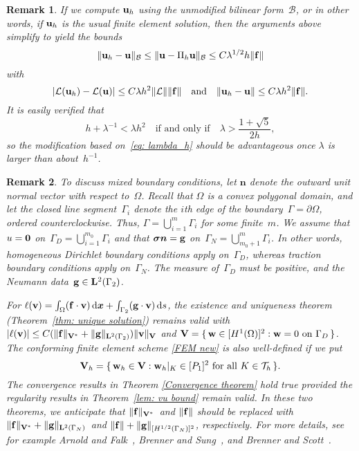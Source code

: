 \documentclass[11pt]{article}
\newcommand{\calB}{\mathcal{B}}
\newcommand{\calL}{\mathcal{L}}
\newcommand{\vf}{{\bf f}}
\newcommand{\vu}{{\bf u}}
\newcommand{\vv}{{\bf v}}
\newcommand{\vV}{{\bf V}}
\newcommand{\vw}{{\bf w}}
\newcommand{\bsx}{{\boldsymbol{x}}}
\newcommand{\vsigma}{\boldsymbol{\sigma}}
\numberwithin{equation}{section}
\newcommand{\ud}{\mathrm{d}}
\newtheorem{remark}{Remark}[section]
\begin{document}
\begin{remark}
If we compute $\vu_h$ using the unmodified bilinear form~$\calB$, or in other
words, if $\vu_h$ is the usual finite element solution, then the arguments above
simplify to yield the bounds
\[
\|\vu_h-\vu\|_{\calB}\le\|\vu-\Pi_h\vu\|_{\calB}
\le C\lambda^{1/2}h\|\vf\|
\]
with
\[
|\calL(\vu_h)-\calL(\vu)|\le C\lambda h^2\|\calL\|\|\vf\|
\quad\text{and}\quad
\|\vu_h-\vu\|\le C\lambda h^2\|\vf\|.
\]
It is easily verified that
\[
h+\lambda^{-1}<\lambda h^2\quad\text{if and only if}\quad
\lambda>\frac{1+\sqrt{5}}{2h},
\]
so the modification based on~\eqref{eq: lambda_h} should be
advantageous once $\lambda$ is larger than about~$h^{-1}$.
\end{remark}
\begin{remark}
To discuss mixed boundary conditions, let $\boldsymbol{n}$ denote the outward 
unit normal vector with respect to~$\Omega$. Recall that $\Omega$ is a convex polygonal domain, and let the 
closed line segment~$\Gamma_i$ denote the $i$th edge of the boundary~$\Gamma=\partial\Omega$, ordered 
counterclockwise.  Thus, $\Gamma=\bigcup_{i=1}^m \Gamma_i$ for some finite~$m$. We assume  that 
$u={\bf 0}$ on~$\Gamma_D=\bigcup_{i=1}^{m_0} \Gamma_i$ and that $\vsigma\boldsymbol{n}={\bf g}$ 
on~$\Gamma_N=\bigcup_{m_0+1}^{m} \Gamma_i$.  In other words, homogeneous Dirichlet boundary conditions
apply on~$\Gamma_D$, whereas traction boundary conditions apply on~$\Gamma_N$. The measure of~$\Gamma_D$
must be positive, and the Neumann data~${\bf g}\in{\bf L}^2(\Gamma_2)$.

For $\ell(\vv)=\int_\Omega(\vf\cdot\vv)\,\ud\bsx+\int_{\Gamma_2}({\bf g}\cdot\vv)\,\ud s$, the 
existence and uniqueness theorem (Theorem~\ref{thm: unique solution}) remains valid with 
$|\ell(\vv)|\le C(\|\vf\|_{\vV^*}+\|{\bf g}\|_{{\bf L}^2(\Gamma_2)})\|\vv\|_{\vV}$ and
$\vV=\{\,\vw\in [H^1(\Omega)]^2:\text{$\vw=0$ on $\Gamma_D$}\,\}$. The conforming finite element scheme \eqref{FEM new} is also well-defined if we put
\[\vV_h=\{\,\vw_h\in\vV:\text{$\vw_h|_K\in[P_1]^2$ for all $K\in\mathcal{T}_h$}\,\}.\]
The convergence results in Theorem \ref{Convergence theorem} hold true provided the regularity results 
in Theorem~\ref{lem: vu bound} remain valid. In these two theorems, we anticipate that 
$\|\vf\|_{\vV^*}$~and $\|\vf\|$ should be replaced with 
$\|\vf\|_{\vV^*}+\|{\bf g}\|_{{\bf L}^2(\Gamma_N)}$~and 
$\|\vf\|+\|{\bf g}\|_{[H^{1/2}(\Gamma_N)]^2}$, respectively.  For more details, see for example Arnold and 
Falk~\cite{ArnoldFalk1987}, Brenner and Sung~\cite[Lemma 2.3]{BrennerSung1992}, and Brenner and Scott~\cite[Page 319]{BrennerScott2008}.
\end{remark}
\end{document}
